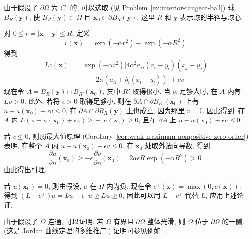 \begin{Proof}
由于假设了 $\partial\Omega$ 为 $C^2$ 的, 可以选取 (见 Problem~\ref{ex:interior-tangent-ball}) 球 $B_R(\bm{y})$, 使 $B_R(\bm{y})\subset\Omega$ 且 $\bm{x}_0\in\partial B_R(\bm{y})$. 这里 $R$ 和 $\bm{y}$ 表示球的半径与球心.

对 $0\leq r=|\bm{x}-\bm{y}|\leq R$, 定义
\begin{equation}\label{eq:boundary-point-exponential-barrier}
v(\bm{x})=\exp(-\alpha r^2)-\exp(-\alpha R^2).
\end{equation}
得到
\begin{equation}\label{eq:boundary-point-barrier-operator}
\begin{aligned}
Lv(\bm{x})&=\exp(-\alpha r^2)\bigl[4\alpha^2a_{ij}(x_i-y_i)(x_j-y_j)\\
&\qquad-2\alpha(a_{ii}+b_i(x_i-y_i))\bigr]+cv.
\end{aligned}
\end{equation}
现在令 $A=B_R(\bm{y})\cap B_{R'}(\bm{x}_0)$, 其中 $R'$ 取得很小. 当 $\alpha$ 足够大时, 在 $A$ 内有 $Lv>0$. 此外, 若将 $\epsilon>0$ 取得足够小, 则在 $\partial A\cap\partial B_{R'}(\bm{x}_0)$ 上有 $u-u(\bm{x}_0)+\epsilon v\leq0$, 在 $\partial A\cap\partial B_R(\bm{y})$ 上也成立, 因为那里 $v=0$. 因此得到, 在 $A$ 内 $L(u-u(\bm{x}_0)+\epsilon v)\geq-cu(\bm{x}_0)\geq0$, 且在 $\partial A$ 上 $u-u(\bm{x}_0)+\epsilon v\leq0$.

若 $c\leq0$, 则弱最大值原理 (Corollary~\ref{cor:weak-maximum-nonpositive-zero-order}) 表明, 在整个 $A$ 内 $u-u(\bm{x}_0)+\epsilon v\leq0$. 在 $\bm{x}_0$ 处取外法向导数, 得到
\begin{equation}\label{eq:boundary-point-positive-normal-derivative}
\dfrac{\partial u}{\partial n}(\bm{x}_0)\geq-\epsilon\dfrac{\partial v}{\partial n}(\bm{x}_0)=2\alpha\epsilon R\exp(-\alpha R^2)>0,
\end{equation}
由此得出引理.

若 $u(\bm{x}_0)=0$, 则由假设, $u$ 在 $\Omega$ 内为负. 现在令 $c^+(\bm{x})=\max(0,c(\bm{x}))$. 得到 $(L-c^+)u=Lu-c^+u\geq Lu\geq0$, 因此可以用 $L-c^+$ 代替 $L$, 应用上述论证.
\end{Proof}

\begin{Remark}
\label{rem:boundary-one-side-jordan}
由于假设了 $\Omega$ 连通, 可以证明, 若 $\Omega$ 有界且 $\partial\Omega$ 整体光滑, 则 $\Omega$ 位于 $\partial\Omega$ 的一侧. (这是 Jordan 曲线定理的多维推广.) 证明可参见例如~\cite{Mas}.
\end{Remark}

